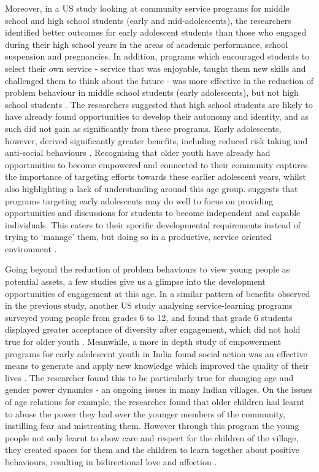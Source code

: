 Moreover, in a US study looking at community service programs for middle school and high school students (early and mid-adolescents), the researchers identified better outcomes for early adolescent students than those who engaged during their high school years in the areas of academic performance, school suspension and pregnancies. In addition, programs which encouraged students to select their own service - service that was enjoyable, taught them new skills and challenged them to think about the future - was more effective in the reduction of problem behaviour in middle school students (early adolescents), but not high school students \citep{Allen1994}. The researchers suggested that high school students are likely to have already found opportunities to develop their autonomy and identity, and as such did not gain as significantly from these programs. Early adolescents, however, derived significantly greater benefits, including reduced risk taking and anti-social behaviours \citep{Allen1994}. Recognising that older youth have already had opportunities to become empowered and connected to their community captures the importance of targeting efforts towards these earlier adolescent years, whilst also highlighting a lack of understanding around this age group. \citet{Allen1994} suggests that programs targeting early adolescents may do well to focus on providing opportunities and discussions for students to become independent and capable individuals. This caters to their specific developmental requirements instead of trying to `manage' them, but doing so in a productive, service oriented environment \citep{Allen1994}. %

Going beyond the reduction of problem behaviours to view young people as potential assets, a few studies give us a glimpse into the development opportunities of engagement at this age. In a similar pattern of benefits observed in the previous study, another US study analysing service-learning programs surveyed young people from grades 6 to 12, and found that grade 6 students displayed greater acceptance of diversity after engagement, which did not hold true for older youth \citep{Blyth2014}. Meanwhile, a more in depth study of empowerment programs for early adolescent youth in India found social action was an effective means to generate and apply new knowledge which improved the quality of their lives \citep{Merchant2013}. The researcher found this to be particularly true for changing age and gender power dynamics - an ongoing issues in many Indian villages. On the issues of age relations for example, the researcher found that older children had learnt to abuse the power they had over the younger members of the community, instilling fear and mistreating them. However through this program the young people not only learnt to show care and respect for the children of the village, they created spaces for them and the children to learn together about positive behaviours, resulting in bidirectional love and affection \citep{Merchant2013}. 

